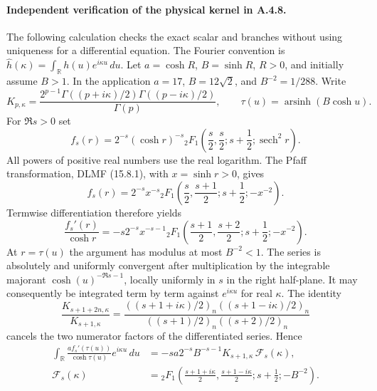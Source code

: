 \paragraph{Independent verification of the physical kernel in A.4.8.}
The following calculation checks the exact scalar and branches without
using uniqueness for a differential equation.  The Fourier convention is
$\widehat h(\kappa)=\int_{\mathbb R}h(u)e^{i\kappa u}\,du$.
Let $a=\cosh R$, $B=\sinh R$, $R>0$, and initially assume $B>1$.
In the application $a=17$, $B=12\sqrt2$, and $B^{-2}=1/288$.
Write
\[
 K_{p,\kappa}=
 \frac{2^{p-1}\Gamma((p+i\kappa)/2)\Gamma((p-i\kappa)/2)}
      {\Gamma(p)},\qquad
 \tau(u)=\operatorname{arsinh}(B\cosh u).
\]
For $\Re s>0$ set
\[
 f_s(r)=2^{-s}(\cosh r)^{-s}
 {}_2F_1\!\left(\frac s2,\frac s2;s+\frac12;\operatorname{sech}^2r\right).
\]
All powers of positive real numbers use the real logarithm.
The Pfaff transformation, DLMF (15.8.1), with $x=\sinh r>0$,
gives
\[
 f_s(r)=2^{-s}x^{-s}
 {}_2F_1\!\left(\frac s2,\frac{s+1}2;s+\frac12;-x^{-2}\right).
\]
Termwise differentiation therefore yields
\[
 \frac{f_s'(r)}{\cosh r}
 =-s2^{-s}x^{-s-1}
 {}_2F_1\!\left(\frac{s+1}2,\frac{s+2}2;s+\frac12;-x^{-2}\right).
\]
At $r=\tau(u)$ the argument has modulus at most $B^{-2}<1$.
The series is absolutely and uniformly convergent after multiplication
by the integrable majorant $\cosh(u)^{-\Re s-1}$, locally uniformly
in $s$ in the right half-plane.  It may consequently be integrated
term by term against $e^{i\kappa u}$ for real $\kappa$.
The identity
\[
 \frac{K_{s+1+2n,\kappa}}{K_{s+1,\kappa}}
 =\frac{((s+1+i\kappa)/2)_n((s+1-i\kappa)/2)_n}
 {((s+1)/2)_n((s+2)/2)_n}
\]
cancels the two numerator factors of the differentiated series. Hence
\begin{align*}
 \int_{\mathbb R}
 \frac{a f_s'(\tau(u))}{\cosh\tau(u)}e^{i\kappa u}\,du
 &=-sa2^{-s}B^{-s-1}K_{s+1,\kappa}\,\mathcal F_s(\kappa),\\
 \mathcal F_s(\kappa)
 &={}_2F_1\!\left(\frac{s+1+i\kappa}2,
                  \frac{s+1-i\kappa}2;
                  s+\frac12;-B^{-2}\right).
\end{align*}

